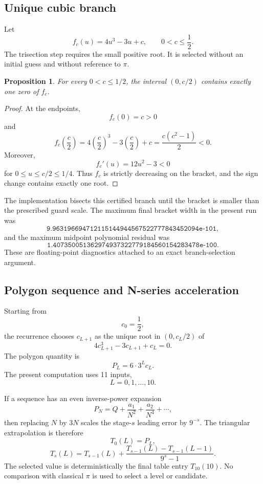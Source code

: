 \documentclass[11pt]{article}
\newtheorem{proposition}{Proposition}
\begin{document}
\subsection{Unique cubic branch}

Let
\[
f_c(u)=4u^3-3u+c,
\qquad 0<c\le \frac12.
\]
The trisection step requires the small positive root.  It is selected without an initial guess and without reference to $\pi$.

\begin{proposition}
For every $0<c\le 1/2$, the interval $(0,c/2)$ contains exactly one zero of $f_c$.
\end{proposition}

\begin{proof}
At the endpoints,
\[
f_c(0)=c>0
\]
and
\[
f_c\!\left(\frac c2\right)
=4\left(\frac c2\right)^3-3\left(\frac c2\right)+c
=\frac{c(c^2-1)}{2}<0.
\]
Moreover,
\[
f_c'(u)=12u^2-3<0
\]
for $0\le u\le c/2\le1/4$.  Thus $f_c$ is strictly decreasing on the bracket, and the sign change contains exactly one root.
\end{proof}

The implementation bisects this certified branch until the bracket is smaller than the prescribed guard scale.  The maximum final bracket width in the present run was
\[
\texttt{9.963196694712115144944567522777843452094e-101},
\]
and the maximum midpoint polynomial residual was
\[
\texttt{1.407350051362974937322779184560154283478e-100}.
\]
These are floating-point diagnostics attached to an exact branch-selection argument.

\subsection{Polygon sequence and N-series acceleration}

Starting from
\[
c_0=\frac12,
\]
the recurrence chooses $c_{L+1}$ as the unique root in $(0,c_L/2)$ of
\[
4c_{L+1}^3-3c_{L+1}+c_L=0.
\]
The polygon quantity is
\[
P_L=6\cdot3^L c_L.
\]
The present computation uses 11 inputs,
\[
L=0,1,\ldots,10.
\]

If a sequence has an even inverse-power expansion
\[
P_N=Q+\frac{a_1}{N^2}+\frac{a_2}{N^4}+\cdots,
\]
then replacing $N$ by $3N$ scales the stage-$s$ leading error by $9^{-s}$.  The triangular extrapolation is therefore
\[
T_0(L)=P_L,
\]
\[
T_s(L)=T_{s-1}(L)
+\frac{T_{s-1}(L)-T_{s-1}(L-1)}{9^s-1}.
\]
The selected value is deterministically the final table entry $T_{10}(10)$.  No comparison with classical $\pi$ is used to select a level or candidate.
\end{document}
